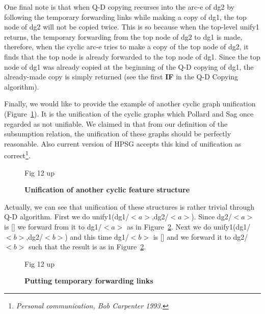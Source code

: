 One final note is that when Q-D copying recurses into the arc-e of dg2
by following the temporary forwarding links while making a copy of
dg1, the top node of dg2 will not be copied twice. This is so because
when the top-level unify1 returns, the temporary forwarding from the
top node of dg2 to dg1 is made, therefore, when the cyclic arc-e tries
to make a copy of the top node of dg2, it finds that the top node is
already forwarded to the top node of dg1. Since the top node of dg1
was already copied at the beginning of the Q-D copying of dg1, the
already-made copy is simply returned (see the first {\bf IF} in the
Q-D Copying algorithm).



Finally, we would like to provide the example of another cyclic graph
unification (Figure~\ref{figure14}).
It is the unification of the cyclic graphs which Pollard
and Sag once regarded as not unifiable.  We claimed in \cite{thesis} that from
our definition of the subsumption relation, the unification of these
graphs should be perfectly reasonable. Also current version of HPSG
accepts this kind of unification as correct\footnote{{\it Personal
communication, Bob Carpenter 1993.}}.


\begin{figure}[htb]
\epsfxsize 140mm
\epsfysize 200mm
\vspace*{2.0cm}
\hspace*{5cm}
\vspace*{2cm}
\hspace*{9cm} Fig 12 up
\vspace*{3cm}
\caption{{\bf Unification of another cyclic feature structure}}
\label{figure14}
\end{figure}



Actually, we can see that unification of these structures is rather
trivial through Q-D algorithm. First we do
unify1(dg1/$<a>$,dg2/$<a>$).  Since dg2/$<a>$ is [] we forward from it
to dg1/$<a>$ as in Figure~\ref{figure15}.  Next we do
unify1(dg1/$<b>$,dg2/$<b>$) and this time dg1/$<b>$ is [] and we
forward it to dg2/$<b>$ such that the result is as in Figure~\ref{figure15}.

\begin{figure}[htb]
\epsfxsize 140mm
\epsfysize 200mm
\vspace*{2.5cm}
\hspace*{5cm}
\vspace*{2cm}
\hspace*{12cm} Fig 12 up
\vspace*{3cm}
\caption{{\bf Putting temporary forwarding links}}
\label{figure15}
\end{figure}

